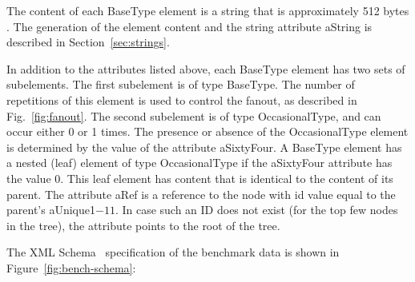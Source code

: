 The content of each {\sf BaseType} element is a   string that is
approximately 512 bytes  \new{}. The generation of the element
content and the string attribute {\sf aString} is described in
Section~\ref{sec:strings}.

In addition to the attributes listed above, each {\sf BaseType}
element has two sets of subelements. The first subelement is of type
{\sf BaseType}. The number of repetitions of this element is used to
control the fanout, as described in Fig.~\ref{fig:fanout}.  The second
subelement is of type {\sf OccasionalType}, and can occur either 0 or 1
times.  The presence or absence of the {\sf OccasionalType} element is
determined by the value of the attribute {\sf aSixtyFour}.  A {\sf
BaseType} element has a nested (leaf) element of type {\sf
OccasionalType} if the {\sf aSixtyFour} attribute has the value 0.
This leaf element has content that is identical to the content of its
parent.  The attribute {\sf aRef} is a reference to the node with id
value equal to the parent's {\sf aUnique1}$-11$. In case such an ID
does not exist (for the top few nodes in the tree), the attribute
points to the root of the tree.

The XML Schema~\cite{xml-schema} specification of the benchmark data
is shown in Figure~\ref{fig:bench-schema}:

